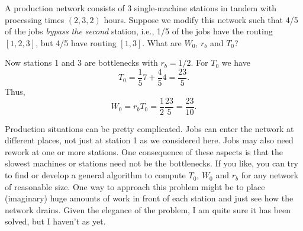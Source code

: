 \begin{exercise}
  A production network consists of 3 single-machine stations in tandem
  with processing times $(2, 3, 2)$ hours.  Suppose we modify this
  network such that 4/5 of the jobs \emph{bypass the second} station,
  i.e., 1/5 of the jobs have the routing $[1,2,3]$, but 4/5 have
  routing $[1,3]$.  What are $W_0$, $r_b$ and $T_0$?
\begin{solution}
  Now stations 1 and 3 are bottlenecks with $r_b = 1/2$. For $T_0$ we have
  \begin{equation*}
    T_0 = \frac15 7 + \frac45 4= \frac{23}5.
  \end{equation*}
Thus, 
\begin{equation*}
W_0 = r_b T_0 = \frac 12 \frac{23}5 = \frac{23}{10}.
\end{equation*}
\end{solution}
\end{exercise}



Production situations can be pretty  complicated. Jobs can enter the network at different places, not  just at station 1 as we considered here. Jobs may also need rework  at one or more stations. One consequence of these aspects is that   the slowest machines or stations need not be the bottlenecks. If you like, you can try to find or develop a general algorithm to compute
 $T_0$, $W_0$ and $r_b$ for any network of reasonable size.  One way to approach this problem might be to  place (imaginary) huge  amounts of work in front of each station and just see how the network drains. Given the elegance of the problem, I am quite   sure it has been solved, but I haven't as yet.



